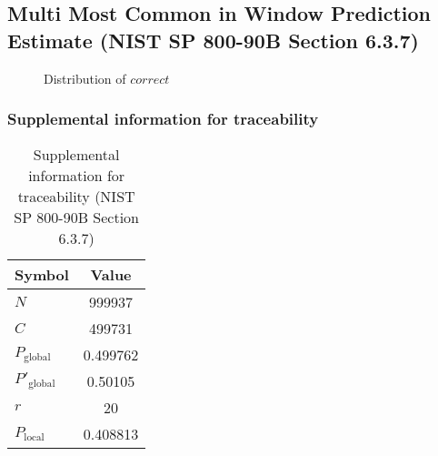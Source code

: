 \documentclass[a3paper,xelatex,english]{bxjsarticle}
\begin{document}
\subsection{Multi Most Common in Window Prediction Estimate (NIST SP 800-90B Section 6.3.7)}
\begin{figure}[htbp]
\centering

\caption{Distribution of $correct$}
\end{figure}
\subsubsection{Supplemental information for traceability}
\renewcommand{\arraystretch}{1.8}
\begin{table}[h]
\caption{Supplemental information for traceability (NIST SP 800-90B Section 6.3.7)}
\begin{center}
\begin{tabular}{|l|c|}
\hline 
\rowcolor{anotherlightblue} %
Symbol				& Value \\ \hline 
$N$				& 999937\\ \hline 
$C$				& 499731\\ \hline 
$P_{\textrm{global}}$				& 0.499762\\ \hline 
$P'_{\textrm{global}}$			&  0.50105\\ \hline 
$r$				& 20\\ \hline 
$P_{\textrm{local}}$ 			& 0.408813\\ \hline
\end{tabular}
\end{center}
\end{table}
\renewcommand{\arraystretch}{1.4}
\clearpage
\end{document}
